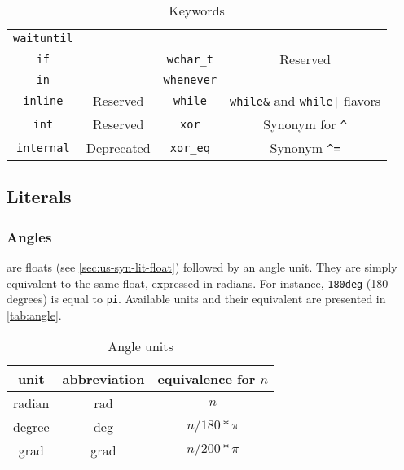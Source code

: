 \begin{table}[\floatpos]
\begin{tabular}{|c|c||c|c|}
    \lstinline"waituntil"         &                                  \\
    \lstinline"if"                &                                  &
    \lstinline"wchar_t"           & Reserved                         \\
    \lstinline"in"                &                                  &
    \lstinline"whenever"          &                                  \\
    \lstinline"inline"            & Reserved                         &
    \lstinline"while"             & \lstinline|while&| and
                                    \lstinline-while|- flavors       \\
    \lstinline"int"               & Reserved                         &
    \lstinline"xor"               & Synonym for \lstinline|^|        \\
    \lstinline"internal"          & Deprecated                       &
    \lstinline"xor_eq"            & Synonym \lstinline|^=|           \\
    \hline
  \end{tabular}
  \caption{Keywords}
  \label{tab:keywords}
\end{table}
\renewcommand{\baselinestretch}{1}

\subsection{Literals}

\subsubsection{Angles}

 are floats (see \autoref{sec:us-syn-lit-float})
followed by an angle unit. They are simply equivalent to the same
float, expressed in radians. For instance, \lstinline|180deg| (180
degrees) is equal to \lstinline|pi|. Available units and their
equivalent are presented in \autoref{tab:angle}.

\begin{table}[\floatposh]
  \centering
  \begin{tabular}{|c|c|c|}
    \hline
    unit        & abbreviation & equivalence for $n$  \\
    \hline
    radian      & rad          & $n$         \\
    degree      & deg          & $n / 180 * \pi$        \\
    grad        & grad         & $n / 200 * \pi$        \\
    \hline
  \end{tabular}
  \caption{Angle units}
  \label{tab:angle}
\end{table}

